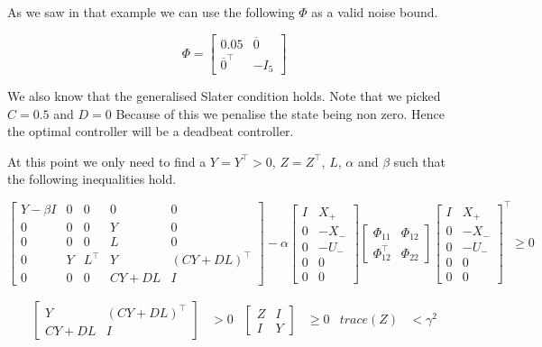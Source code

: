 As we saw in that example we can use the following $\Phi$ as a valid noise bound.

\begin{equation*}
\Phi = \begin{bmatrix} 0.05 & \overline{0} \\ \overline{0}^\top & -I_5 \end{bmatrix}
\end{equation*}

We also know that the generalised Slater condition holds. Note that we picked $C = 0.5$ and $D=0$ Because of this we penalise the state being non zero. Hence the optimal controller will be a deadbeat controller. 

At this point we only need to find a $Y = Y^\top > 0$, $Z = Z^\top$, $L$, $\alpha$ and $\beta$ such that the following inequalities hold.

\begin{equation*}
	\begin{bmatrix}
		Y - \beta I & 0 & 0 & 0 & 0 \\
		0 & 0 & 0 & Y & 0 \\
		0 & 0 & 0 & L & 0 \\
		0 & Y & L^\top & Y & (CY + DL)^\top \\
		0 & 0 & 0 & CY + DL & I 
	\end{bmatrix} - \alpha
	\begin{bmatrix} I&X_+ \\ 0 & -X_- \\ 0&-U_- \\ 0&0 \\ 0&0 \end{bmatrix}
	\begin{bmatrix} \Phi_{11} & \Phi_{12} \\ \Phi_{12}^\top & \Phi_{22} \end{bmatrix}
	\begin{bmatrix} I&X_+ \\ 0 & -X_- \\ 0&-U_- \\ 0&0 \\ 0&0 \end{bmatrix}^\top \geq 0
\end{equation*}

\begin{align*}
	\begin{bmatrix} Y & (CY + DL)^\top \\ CY + DL & I \end{bmatrix} &> 0 &
	\begin{bmatrix} Z & I \\ I & Y \end{bmatrix} &\geq 0 &
	trace(Z) &< \gamma^2
\end{align*}

